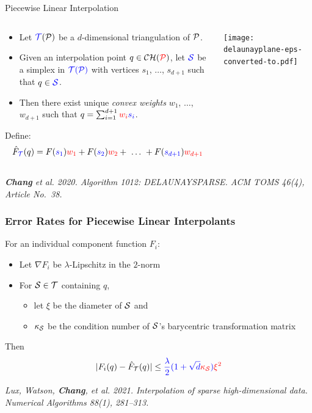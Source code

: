 \documentclass[aspectratio=169]{beamer}
\begin{document}
\begin{frame}{Piecewise Linear Interpolation}
\begin{columns}
\begin{column}{0.7\textwidth}
\begin{itemize}
\item Let ${\color{blue} \cal T}({\cal P})$ be a
$d$-dimensional triangulation of ${\cal P}$.
\item Given an interpolation point $q \in {\cal CH}({\color{red} \cal P})$,
let ${\color{blue} \cal S}$ be a simplex in ${\color{blue} \cal T(P)}$
with vertices {\color{blue} $s_1$, $\ldots$, $s_{d+1}$} such that
$q\in {\color{blue} \cal S}$.
\item Then there exist unique {\it convex weights}
{\color{red} $w_1$, $\ldots$, $w_{d+1}$} 
such that $q = \sum_{i=1}^{d+1} {\color{red} w_i} {\color{blue} s_i}$.
\end{itemize}
\pause
\bigskip
Define:
$$
\hat{F}_{\color{blue} \cal T} (q) =
F({\color{blue} s_1}) {\color{red} w_1} +
F({\color{blue} s_2}) {\color{red} w_2} +
\text{ $\ldots$ } +
F({\color{blue} s_{d+1}}){\color{red} w_{d+1}}
$$
\end{column}
\begin{column}{0.3\textwidth}
\texttt{[image: delaunayplane-eps-converted-to.pdf]}
\end{column}
\end{columns}

\pause

\vfill

{\small \it {\bf Chang} et al. 2020. Algorithm 1012: DELAUNAYSPARSE. ACM TOMS 46(4), Article No.~38.}

\end{frame}

\begin{frame}\frametitle{Error Rates for Piecewise Linear Interpolants}
For an individual component function $F_i$:
\begin{itemize}
\item Let $\nabla F_i$ be $\lambda$-Lipschitz in the $2$-norm\\
\item For ${\cal S}\in {\cal T}$ containing $q$,
\begin{itemize}
\item let $\xi$ be the diameter of ${\cal S}$ and
\item $\kappa_{\cal S}$ be the condition number of ${\cal S}$'s
barycentric transformation matrix
\end{itemize}
\end{itemize}
\pause
\bigskip
Then
$$
|F_i(q) - {\hat F}_{\cal T}(q)| \leq
{\color{blue} \frac{\lambda}{2}(1 + \sqrt{d}{\color{red}\kappa_{\cal S}})}
{\color{red} \xi^2}
$$

\bigskip

\pause

\vfill

{\small \it Lux, Watson, {\bf Chang}, et al. 2021. Interpolation of sparse high-dimensional data. Numerical Algorithms 88(1), 281--313.}

\end{frame}
\end{document}
